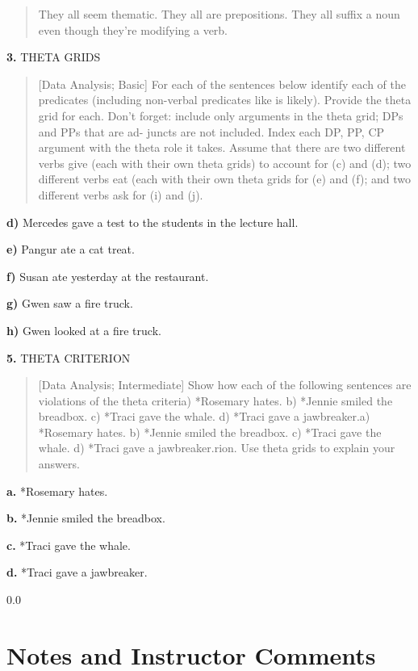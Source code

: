\documentclass[11pt,notitlepage]{article}
\newcommand{\question}[2]{\textbf{#1.} #2}
\newcommand{\subquestion}[2]{\par\hspace{0.5cm} \textbf{#1)} #2}
\begin{document}
\begin{quote}
  They all seem thematic. They all are prepositions. They all suffix a
  noun even though they're modifying a verb.
\end{quote}


\question{3}{THETA GRIDS}
\begin{quote}
[Data Analysis; Basic]
For each of the sentences below identify each of the predicates
(including non-verbal predicates like is likely). Provide the theta
grid for each. Don’t forget: include only arguments in the theta grid;
DPs and PPs that are ad- juncts are not included. Index each DP, PP,
CP argument with the theta role it takes. Assume that there are two
different verbs give (each with their own theta grids) to account for
(c) and (d); two different verbs eat (each with their own theta grids
for (e) and (f); and two different verbs ask for (i) and (j).\end{quote}

\subquestion{d}{Mercedes gave a test to the students in the lecture
  hall.}

\subquestion{e}{Pangur ate a cat treat.}

\subquestion{f}{Susan ate yesterday at the restaurant.}

\subquestion{g}{Gwen saw a fire truck.}

\subquestion{h}{Gwen looked at a fire truck.}

\question{5}{THETA CRITERION}
\begin{quote}
[Data Analysis; Intermediate]
Show how each of the following sentences are violations of the theta
criteria) *Rosemary hates.
b) *Jennie smiled the breadbox.
c) *Traci gave the whale.
d) *Traci gave a jawbreaker.a) *Rosemary hates.
b) *Jennie smiled the breadbox.
c) *Traci gave the whale.
d) *Traci gave a jawbreaker.rion. Use theta grids to explain your answers.
\end{quote}

\question{a}{*Rosemary hates.}

\question{b}{*Jennie smiled the breadbox.}

\question{c}{*Traci gave the whale.}

\question{d}{*Traci gave a jawbreaker.}

\newpage
  {\setlength{\baselineskip}%
           {0.0\baselineskip}
  \section*{Notes and Instructor Comments}
  \hrulefill \par}
\end{document}

